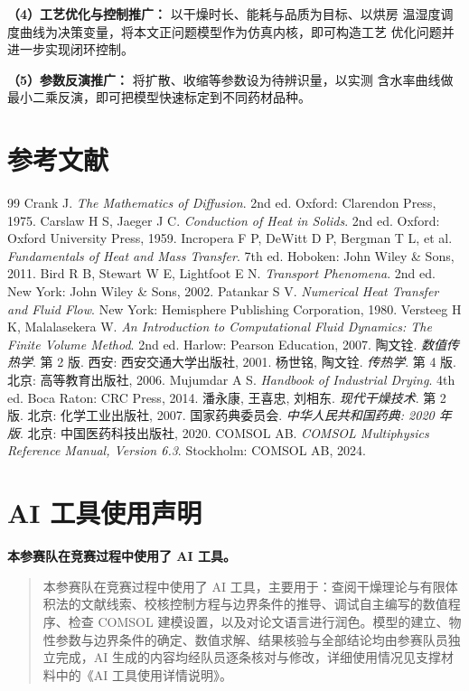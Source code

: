 \documentclass[12pt,a4paper]{article}
\begin{document}
\textbf{（4）工艺优化与控制推广：} 以干燥时长、能耗与品质为目标、以烘房
温湿度调度曲线为决策变量，将本文正问题模型作为仿真内核，即可构造工艺
优化问题并进一步实现闭环控制。

\textbf{（5）参数反演推广：} 将扩散、收缩等参数设为待辨识量，以实测
含水率曲线做最小二乘反演，即可把模型快速标定到不同药材品种。


\label{endofbody}
\clearpage
\section{参考文献}

\begin{thebibliography}{99}
 Crank J. \emph{The Mathematics of Diffusion}. 2nd ed. Oxford: Clarendon Press, 1975.
 Carslaw H S, Jaeger J C. \emph{Conduction of Heat in Solids}. 2nd ed. Oxford: Oxford University Press, 1959.
 Incropera F P, DeWitt D P, Bergman T L, et al. \emph{Fundamentals of Heat and Mass Transfer}. 7th ed. Hoboken: John Wiley \& Sons, 2011.
 Bird R B, Stewart W E, Lightfoot E N. \emph{Transport Phenomena}. 2nd ed. New York: John Wiley \& Sons, 2002.
 Patankar S V. \emph{Numerical Heat Transfer and Fluid Flow}. New York: Hemisphere Publishing Corporation, 1980.
 Versteeg H K, Malalasekera W. \emph{An Introduction to Computational Fluid Dynamics: The Finite Volume Method}. 2nd ed. Harlow: Pearson Education, 2007.
 陶文铨. \emph{数值传热学}. 第 2 版. 西安: 西安交通大学出版社, 2001.
 杨世铭, 陶文铨. \emph{传热学}. 第 4 版. 北京: 高等教育出版社, 2006.
 Mujumdar A S. \emph{Handbook of Industrial Drying}. 4th ed. Boca Raton: CRC Press, 2014.
 潘永康, 王喜忠, 刘相东. \emph{现代干燥技术}. 第 2 版. 北京: 化学工业出版社, 2007.
 国家药典委员会. \emph{中华人民共和国药典: 2020 年版}. 北京: 中国医药科技出版社, 2020.
 COMSOL AB. \emph{COMSOL Multiphysics Reference Manual, Version 6.3}. Stockholm: COMSOL AB, 2024.
\end{thebibliography}

\section*{AI 工具使用声明}

\noindent\textbf{本参赛队在竞赛过程中使用了 AI 工具。}

\begin{quote}
本参赛队在竞赛过程中使用了 AI 工具，主要用于：查阅干燥理论与有限体积法的文献线索、校核控制方程与边界条件的推导、调试自主编写的数值程序、检查 COMSOL 建模设置，以及对论文语言进行润色。模型的建立、物性参数与边界条件的确定、数值求解、结果核验与全部结论均由参赛队员独立完成，AI 生成的内容均经队员逐条核对与修改，详细使用情况见支撑材料中的《AI 工具使用详情说明》。
\end{quote}
\clearpage
\appendix
\end{document}
